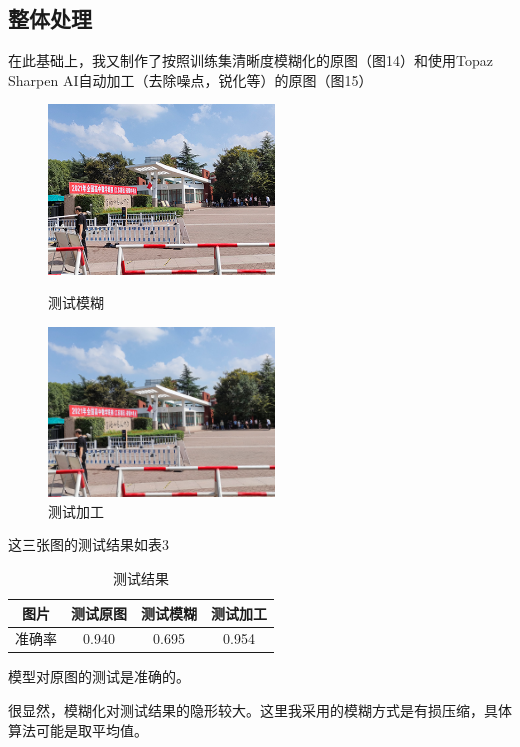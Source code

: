 \documentclass[boldfont,linespread=1.35]{ctexart}
\begin{document}
\subsection{整体处理}
在此基础上，我又制作了按照训练集清晰度模糊化的原图（图14）和使用Topaz Sharpen AI自动加工（去除噪点，锐化等）的原图（图15）
\begin{figure}[h]
	\centering
	\begin{minipage}[t]{0.45\linewidth}
		\centering
		\includegraphics[width=6cm]{../测试图/测试模糊}
		\color{gray}\caption{测试模糊}
	\end{minipage}
	\begin{minipage}[t]{0.45\linewidth} %
		\centering
		\includegraphics[width=6cm]{../测试图/测试加工}
		\color{gray}\caption{测试加工}
	\end{minipage}
\end{figure}

这三张图的测试结果如表3
\begin{table} [h]
	\centering
	\caption{测试结果}
	\begin{tabular}
		{cccc}
		\toprule[1pt]
		\rowcolor[gray]{0.9} 图片 &测试原图 &测试模糊 &测试加工\\
		\midrule
		准确率   &0.940 &0.695 &0.954\\
		\bottomrule[1pt]
	\end{tabular}
\end{table}

模型对原图的测试是准确的。

很显然，模糊化对测试结果的隐形较大。这里我采用的模糊方式是有损压缩，具体算法可能是取平均值。
\end{document}
